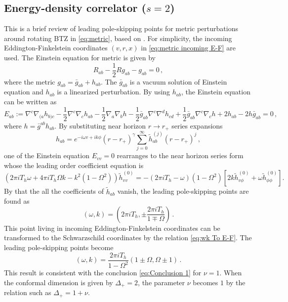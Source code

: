 \documentclass[11pt,a4paper]{article}
\newcommand{\ra}{\rightarrow}
\begin{document}
\subsection{Energy-density correlator ($s=2$)}\label{subsec:Energy-density correlator}
This is a brief review of leading pole-skipping points for metric perturbations around rotating BTZ in \eqref{eq:metric}, based on \cite{Liu:2020yaf}. For simplicity, the incoming Eddington-Finkelstein coordinates $(v,r,x)$ in \eqref{eq:metric incoming E-F} are used.
The Einstein equation for metric is given by
\begin{equation}
    R_{ab}-\frac{1}{2}R g_{ab} - g_{ab} = 0\,,
\end{equation}
where the metric $g_{ab}=\bar{g}_{ab}+h_{ab}$. The $\bar{g}_{ab}$ is a vacuum solution of Einstein equation and $h_{ab}$ is a linearized perturbation. By using $h_{ab}$, the Einstein equation can be written as
\begin{equation} \label{eq:Energy density eqn}
    E_{ab}:=\nabla^c\nabla_{(a}h_{b)c}-\frac{1}{2}\nabla^c \nabla_c h_{ab} -\frac{1}{2}\nabla_a \nabla_b h -\frac{1}{2} \bar{g}_{ab} \nabla^c \nabla^d h_{cd} +\frac{1}{2} \bar{g}_{ab} \nabla^c \nabla_c h + 2 h_{ab} - 2 h \bar{g}_{ab} = 0\,,
\end{equation}
where $h=\bar{g}^{ab}h_{ab}$. By substituting near horizon $r \ra r_+$ series expansions
\begin{equation}
    h_{ab} = e^{-i \omega v + i k \phi} (r- r_+)^\gamma \sum^{\infty}_{j=0} \tilde{h} _{ab}^{(j)} (r-r_+)^j\,,
\end{equation}
one of the Einstein equation $E_{vv}=0$ rearranges to the near horizon series form whose the leading order coefficient equation is
\begin{equation}
    \left(2\pi i T_h \omega + 4\pi i T_h \Omega k - k^2 (1 - \Omega^2) \right)\tilde{h}^{(0)}_{vv} = - (2\pi i T_h - \omega )(1 - \Omega^2)  \left[ 2 k\tilde{h}^{(0)}_{v \phi} + \omega \tilde{h}^{(0)}_{\phi \phi } \right].
\end{equation}
By that the all the coefficients of $\tilde{h}_{ab}$ vanish, the leading pole-skipping points are found as
\begin{equation}
    (\omega, k) = \left(2\pi i T_h, \pm \frac{2\pi i T_h}{1 \mp \Omega} \right)\,.
\end{equation}
This point living in incoming Eddington-Finkelstein coordinates can be transformed to the Schwarzschild coordinates by the relation \eqref{eq:wk To E-F}. The leading pole-skipping points become
\begin{equation}
    (\omega, k) = \frac{2\pi i T_h}{1-\Omega^2}\left(1\pm \Omega, \Omega \pm 1 \right)\,.
\end{equation}
This result is consistent with the conclusion \eqref{eq:Conclusion 1} for $\nu = 1$. When the conformal dimension is given by $\Delta_+ = 2$, the parameter $\nu$ becomes $1$ by the relation such as $\Delta_+ = 1 + \nu$.
\end{document}
